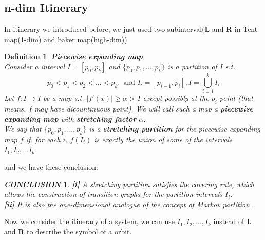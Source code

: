\documentclass[12pt]{article}
\theoremstyle{plain}
\newtheorem{definition}{{\color{red}\textbf{Definition}}}[section]
\newtheorem{conclusion}{\textit{\textbf{CONCLUSION}}}[section]
\begin{document}
\subsection{n-dim Itinerary}

In itinerary we introduced before, we just used two subinterval(\textbf{L} and \textbf{R} in Tent map(1-dim) and baker map(high-dim))

\begin{definition}\textbf{Piecewise expanding map}
\\\noindent Consider a interval $I = [p_0, p_k]$ and $\{p_0, p_1, \ldots, p_k\}$ is a partition of $I$ s.t. 
$$
p_0 < p_1 < p_2 < \ldots < p_k, \text{ and } I_i = [p_{i-1}, p_i], I = \bigcup_{i = 1}^{k}I_i
$$
Let $f:I \rightarrow I$ be a map s.t. $|f'(x)|\geq \alpha > $1 except possibly at the $p_i$ point (that means, $f$ may have dicountinuous point). We will call such a map a \textbf{piecewise expanding map} with \textbf{stretching factor} $\alpha$. 
\\\noindent We say that $\{p_0, p_1, \ldots, p_k\}$ is a \textbf{stretching partition} for the piecewise expanding map $f$ if, for each $i$, $f(I_i)$ is exactly the union of some of the intervals $I_1, I_2, \ldots I_k$.
\end{definition}


and we have these conclusion:
\begin{conclusion} \textbf{[i]} A stretching partition satisfies the covering rule, which allows the construction of transition graphs for the partition intervals $I_i$. 
\\\noindent \textbf{[ii]} It is also the one-dimensional analogue of the concept of Markov partition.
\end{conclusion}

Now we consider the itinerary of a system, we can use $I_1, I_2, \ldots, I_k$ instead of \textbf{L} and \textbf{R} to describe the symbol of a orbit.
\end{document}
